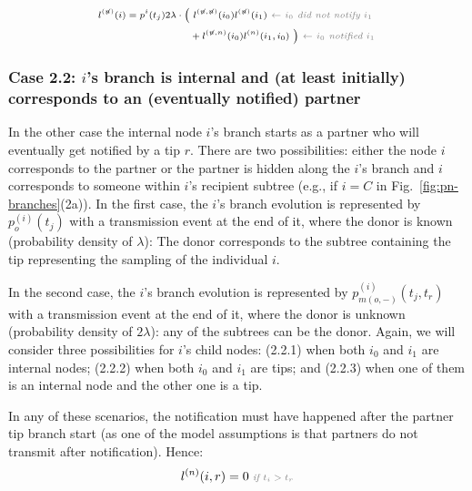 \documentclass[a4paper,10pt]{article}
\begin{document}
\begin{equation}
\scriptsize
\begin{split}
l^{(\not{n})}(i) = p^{i}(t_j) 2\lambda \cdot 
\Big(&~l^{(\not{n},\not{n})}(i_0)l^{(\not{n})}(i_1) \textit{\color{gray}~$\leftarrow$ $i_0$ did not notify $i_1$ } \\
&+ l^{(\not{n},n)}(i_0)l^{(n)}(i_1,i_0)~\Big) \textit{\color{gray}~$\leftarrow$ $i_0$ notified $i_1$} \\
\end{split}\label{eq:lu-int-tip}
\end{equation}

\subsubsection*{Case 2.2: $i$'s branch is internal and (at least initially) corresponds to an (eventually notified) partner} 

In the other case the internal node $i$'s branch starts as a partner who will eventually get notified by a tip $r$.
There are two possibilities: either the node $i$ corresponds to the partner or the partner is hidden along the $i$'s branch and $i$ corresponds to someone within $i$'s recipient subtree (e.g., if $i=C$ in Fig.~\ref{fig:pn-branches}(2a)). In the first case, the $i$'s branch evolution is represented by $p_o^{(i)}(t_j)$ with a transmission event at the end of it, where the donor is known (probability density of $\lambda$): The donor corresponds to the subtree containing the tip representing the sampling of the individual $i$.

In the second case, the $i$'s branch evolution is represented by $p_{m(o,-)}^{(i)}(t_j,t_r)$ with a transmission event at the end of it, where the donor is unknown (probability density of $2\lambda$): any of the subtrees can be the donor.
Again, we will consider three possibilities for $i$'s child nodes: (2.2.1) when both $i_0$ and $i_1$ are internal nodes; (2.2.2) when both $i_0$ and $i_1$ are tips; and (2.2.3) when one of them is an internal node and the other one is a tip.

In any of these scenarios, the notification must have happened after the partner tip branch start (as one of the model assumptions is that partners do not transmit after notification). Hence:
\begin{equation}
\scriptsize
l^{(n)}(i, r) = 0 \textit{\color{gray}~if $t_i > t_r$} \\
\label{eq:lp-zero}
\end{equation}
\end{document}

